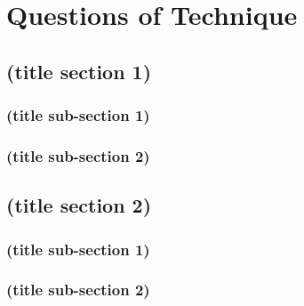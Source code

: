 \documentclass{book}
\begin{document}
\chapter{Questions of Technique}
\section{(title section 1)}
\subsection{(title sub-section 1)}
\subsection{(title sub-section 2)}
\section{(title section 2)}
\subsection{(title sub-section 1)}
\subsection{(title sub-section 2)}
\end{document}
